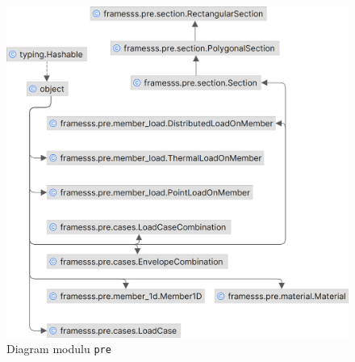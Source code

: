 \begin{figure}[H]
    \includegraphics{assets/figures/framesss/uml/pre.png}
    \caption{Diagram modulu \texttt{pre}}
    \label{fig:modul_pre}
\end{figure}



